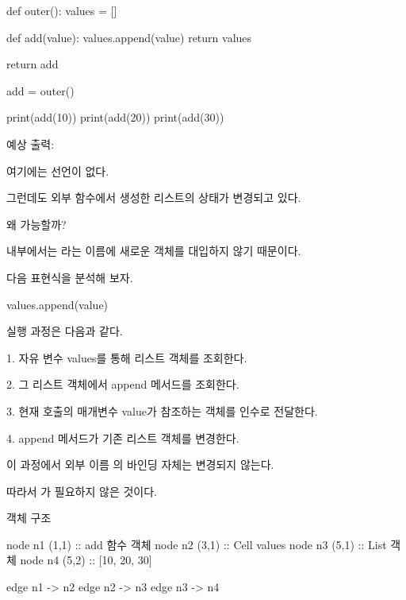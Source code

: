 \begin{dhkcode}
def outer():
    values = []

    def add(value):
        values.append(value)
        return values

    return add


add = outer()

print(add(10))
print(add(20))
print(add(30))
\end{dhkcode}

예상 출력:

\begin{dhkzsh}
[10]
[10, 20]
[10, 20, 30]
\end{dhkzsh}

여기에는  선언이 없다.

그런데도 외부 함수에서 생성한 리스트의 상태가 변경되고 있다.

왜 가능할까?

 내부에서는 라는 이름에 새로운 객체를 대입하지 않기 때문이다.

다음 표현식을 분석해 보자.

\begin{dhkcode}
values.append(value)
\end{dhkcode}

실행 과정은 다음과 같다.

\begin{dhksmry}
1. 자유 변수 values를 통해 리스트 객체를 조회한다.

2. 그 리스트 객체에서 append 메서드를 조회한다.

3. 현재 호출의 매개변수 value가 참조하는 객체를 인수로 전달한다.

4. append 메서드가 기존 리스트 객체를 변경한다.
\end{dhksmry}

이 과정에서 외부 이름 의 바인딩 자체는 변경되지 않는다.

따라서 가 필요하지 않은 것이다.

\begin{dhknote}
\begin{dhksmry}[centered]
객체 구조
\end{dhksmry}
\end{dhknote}

\begin{dhkdiagram}[in=6]
node n1 (1,1) :: add 함수 객체
node n2 (3,1) :: Cell values
node n3 (5,1) :: List 객체
node n4 (5,2) :: [10, 20, 30]

edge n1 -> n2
edge n2 -> n3
edge n3 -> n4
\end{dhkdiagram}

